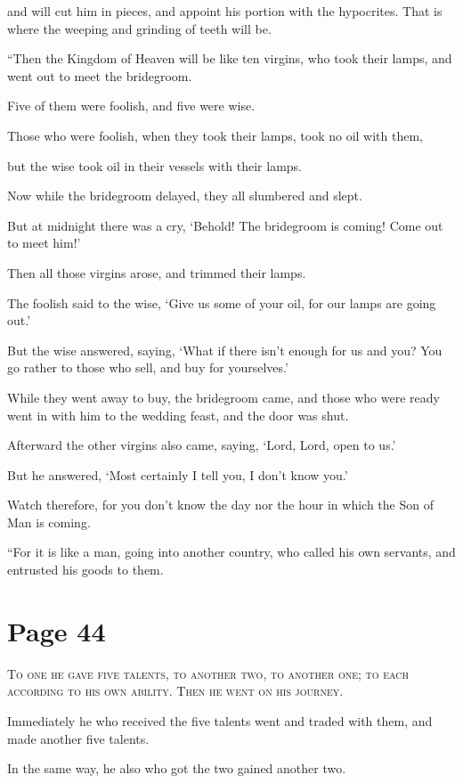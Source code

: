 and will cut him in pieces, and appoint his portion with the hypocrites. That is where the weeping and grinding of teeth will be.

“Then the Kingdom of Heaven will be like ten virgins, who took their lamps, and went out to meet the bridegroom.

Five of them were foolish, and five were wise.

Those who were foolish, when they took their lamps, took no oil with them,

but the wise took oil in their vessels with their lamps.

Now while the bridegroom delayed, they all slumbered and slept.

But at midnight there was a cry, ‘Behold! The bridegroom is coming! Come out to meet him!’

Then all those virgins arose, and trimmed their lamps.

The foolish said to the wise, ‘Give us some of your oil, for our lamps are going out.’

But the wise answered, saying, ‘What if there isn’t enough for us and you? You go rather to those who sell, and buy for yourselves.’

While they went away to buy, the bridegroom came, and those who were ready went in with him to the wedding feast, and the door was shut.

Afterward the other virgins also came, saying, ‘Lord, Lord, open to us.’

But he answered, ‘Most certainly I tell you, I don’t know you.’

Watch therefore, for you don’t know the day nor the hour in which the Son of Man is coming.

“For it is like a man, going into another country, who called his own servants, and entrusted his goods to them.



\chapterornament
\section*{Page 44}

\lettrine{T}{o one he gave five talents, to another two, to another one; to each according to his own ability. Then he went on his journey.}

Immediately he who received the five talents went and traded with them, and made another five talents.

In the same way, he also who got the two gained another two.

